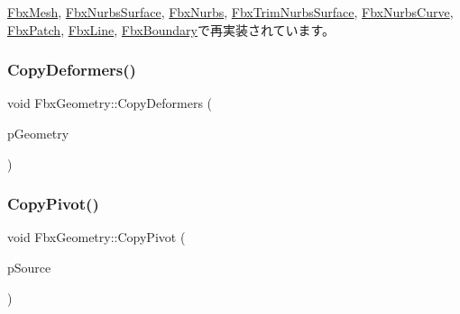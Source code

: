 \hyperlink{class_fbx_mesh_a0f041743536ee5ccbc9a086e3ef1c663}{Fbx\+Mesh}, \hyperlink{class_fbx_nurbs_surface_a1da47f75af4920a3fb4a94690d8ada8c}{Fbx\+Nurbs\+Surface}, \hyperlink{class_fbx_nurbs_ac7c9a9018b4fdbe72b258a2fa0a3367d}{Fbx\+Nurbs}, \hyperlink{class_fbx_trim_nurbs_surface_a4407d30e83346ab3cb30ccf67d7bb289}{Fbx\+Trim\+Nurbs\+Surface}, \hyperlink{class_fbx_nurbs_curve_ad48046242c0a63d929b5440563668f79}{Fbx\+Nurbs\+Curve}, \hyperlink{class_fbx_patch_a424542a42ec75d3c5236cc366adecd89}{Fbx\+Patch}, \hyperlink{class_fbx_line_aeb9e0c53cf02d3e4e206b25c87c06256}{Fbx\+Line}, \hyperlink{class_fbx_boundary_a6fe59f45c17eeebbabaeff235058ac70}{Fbx\+Boundary}で再実装されています。

\mbox{\label{class_fbx_geometry_a0fa8343b20fb5a9c0b0bc15a83967972}} 
\subsubsection{\texorpdfstring{Copy\+Deformers()}{CopyDeformers()}}
{\footnotesize\ttfamily void Fbx\+Geometry\+::\+Copy\+Deformers (\begin{DoxyParamCaption}\item[{const \hyperlink{class_fbx_geometry}{Fbx\+Geometry} $\ast$}]{p\+Geometry }\end{DoxyParamCaption})\hspace{0.3cm}{\ttfamily [protected]}}

\mbox{\label{class_fbx_geometry_a97edd8b50b825e220a2c246936480160}} 
\subsubsection{\texorpdfstring{Copy\+Pivot()}{CopyPivot()}}
{\footnotesize\ttfamily void Fbx\+Geometry\+::\+Copy\+Pivot (\begin{DoxyParamCaption}\item[{const \hyperlink{class_fbx_geometry}{Fbx\+Geometry} $\ast$}]{p\+Source }\end{DoxyParamCaption})\hspace{0.3cm}{\ttfamily [protected]}}

\mbox{\label{class_fbx_geometry_ad79e9244da135a8fd62e47932ea68112}} 
